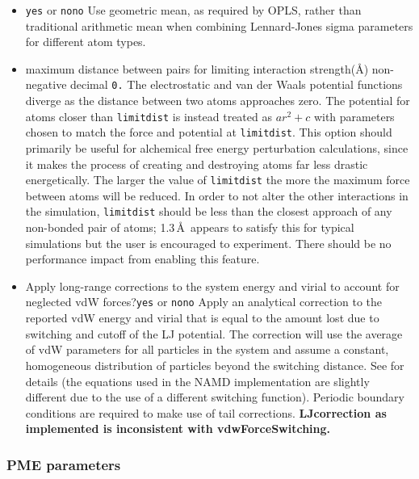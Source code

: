 \begin{itemize}
\item
{}
{{\tt yes} or {\tt no}}{{\tt no}}
{Use geometric mean, as required by  OPLS, rather than
traditional arithmetic mean when combining Lennard-Jones sigma parameters
for different atom types.}

\item
{}
{maximum distance between pairs for limiting interaction strength(\AA)}
{non-negative decimal}
{{\tt 0.}}
{
The electrostatic and van der Waals potential functions diverge
as the distance between two atoms approaches zero.
The potential for atoms closer than {\tt limitdist} is instead
treated as $a r^2 + c$ with parameters chosen to match the
force and potential at {\tt limitdist}.
This option should primarily be useful for alchemical free energy
perturbation calculations, since it makes the process of creating
and destroying atoms far less drastic energetically.
The larger the value of {\tt limitdist} the more the maximum force
between atoms will be reduced.
In order to not alter the other interactions in the simulation,
{\tt limitdist} should be less than the closest approach
of any non-bonded pair of atoms; 1.3\,\AA\ appears to satisfy this
for typical simulations but the user is encouraged to experiment.
There should be no performance impact from enabling this feature.
}

\item
{}
{Apply long-range corrections to the system energy and virial to
account for neglected vdW forces?}{{\tt yes} or {\tt no}}{{\tt no}}
{Apply an analytical correction to the reported vdW energy and virial
that is equal to the amount lost due to switching and cutoff of the LJ
potential. The correction will use the average of vdW parameters for
all particles in the system and assume a constant, homogeneous
distribution of particles beyond the switching distance. See 
\cite{Shirts2007} for details (the equations used in the NAMD
implementation are slightly different due to the use of a different
switching function). Periodic boundary conditions are required to make
use of tail corrections.
{\bf LJcorrection as implemented is inconsistent with vdwForceSwitching.}}

\end{itemize}


\subsubsection{PME parameters}

